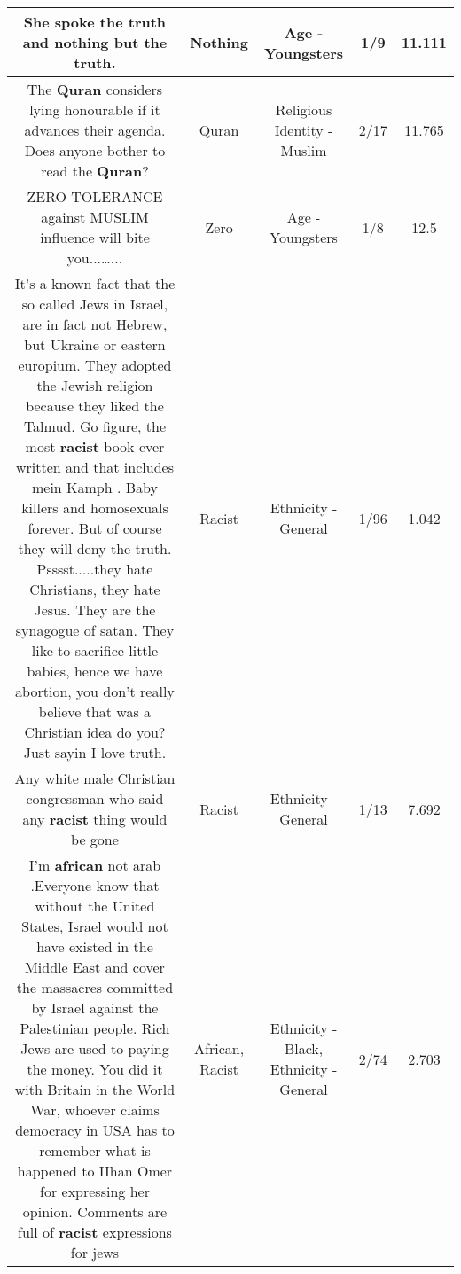 \documentclass[11pt]{article}
\newlength\mylength
\begin{document}
\begin{center}
\begin{longtable}{|C{.65\mylength}|C{.30\mylength}|C{.12\mylength}|C{.12\mylength}|C{.12\mylength}|}
  \small She spoke the truth and \textbf{nothing} but the truth.\normalsize   & Nothing & Age - Youngsters & 1/9 & 11.111 \\  \hline
  \small The \textbf{Quran} considers lying honourable if it advances their agenda. Does anyone bother to read the \textbf{Quran}?\normalsize   & Quran & Religious Identity - Muslim & 2/17 & 11.765 \\  \hline
  \small ZERO TOLERANCE against MUSLIM influence will  bite you...…...\normalsize   & Zero & Age - Youngsters & 1/8 & 12.5 \\  \hline
  \small It's a known fact that the so called Jews in Israel, are in fact not Hebrew, but Ukraine or eastern europium. They adopted the Jewish religion because they liked the Talmud. Go figure, the most \textbf{racist} book ever written and that includes mein Kamph . Baby killers and homosexuals forever. But of course they will deny the truth. Psssst.....they hate Christians, they hate Jesus. They are the synagogue of satan. They like to sacrifice little babies, hence we have abortion, you don't really believe that was a Christian idea do you? Just sayin I love truth.\normalsize   & Racist & Ethnicity - General & 1/96 & 1.042 \\  \hline
  \small Any white male Christian congressman who said any \textbf{racist} thing would be gone\normalsize   & Racist & Ethnicity - General & 1/13 & 7.692 \\  \hline
  \small I'm \textbf{african} not arab .Everyone know that without the United States, Israel would not have existed in the Middle East and cover the massacres committed by Israel against the Palestinian people. Rich Jews are used to paying the money. You did it with Britain in the World War, whoever claims democracy in USA has to remember what is happened to IIhan Omer for expressing her opinion. Comments are full of \textbf{racist} expressions for jews\normalsize   & African, Racist & Ethnicity - Black, Ethnicity - General & 2/74 & 2.703 \\  \hline

\end{longtable}
\end{center}
\end{document}
